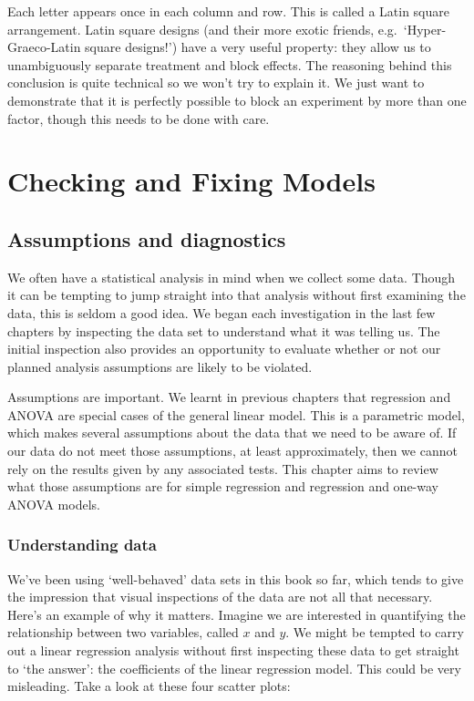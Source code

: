 \documentclass[
]{book}
\begin{document}
Each letter appears once in each column and row. This is called a Latin square arrangement. Latin square designs (and their more exotic friends, e.g.~`Hyper-Graeco-Latin square designs!') have a very useful property: they allow us to unambiguously separate treatment and block effects. The reasoning behind this conclusion is quite technical so we won't try to explain it. We just want to demonstrate that it is perfectly possible to block an experiment by more than one factor, though this needs to be done with care.

\hypertarget{part-checking-and-fixing-models}{%
\part{Checking and Fixing Models}\label{part-checking-and-fixing-models}}

\hypertarget{assumptions-and-diagnostics}{%
\chapter{Assumptions and diagnostics}\label{assumptions-and-diagnostics}}

We often have a statistical analysis in mind when we collect some data. Though it can be tempting to jump straight into that analysis without first examining the data, this is seldom a good idea. We began each investigation in the last few chapters by inspecting the data set to understand what it was telling us. The initial inspection also provides an opportunity to evaluate whether or not our planned analysis assumptions are likely to be violated.

Assumptions are important. We learnt in previous chapters that regression and ANOVA are special cases of the general linear model. This is a parametric model, which makes several assumptions about the data that we need to be aware of. If our data do not meet those assumptions, at least approximately, then we cannot rely on the results given by any associated tests. This chapter aims to review what those assumptions are for simple regression and regression and one-way ANOVA models.

\hypertarget{understanding-data}{%
\section{Understanding data}\label{understanding-data}}

We've been using `well-behaved' data sets in this book so far, which tends to give the impression that visual inspections of the data are not all that necessary. Here's an example of why it matters. Imagine we are interested in quantifying the relationship between two variables, called \(x\) and \(y\). We might be tempted to carry out a linear regression analysis without first inspecting these data to get straight to `the answer': the coefficients of the linear regression model. This could be very misleading. Take a look at these four scatter plots:
\end{document}
